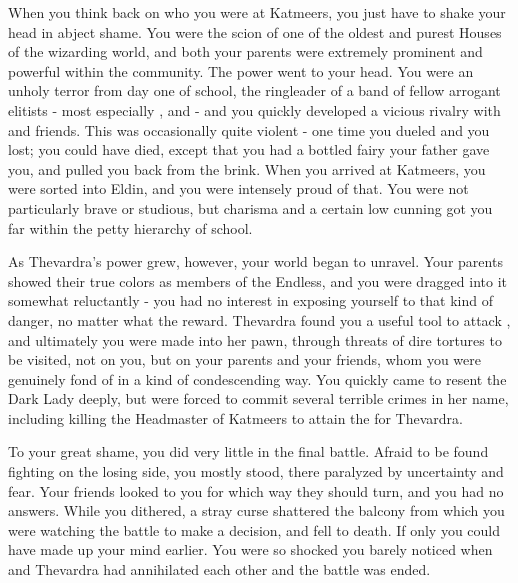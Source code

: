 \documentclass[char]{Katmeers}
\begin{document}
\name{\cMalfoy{}}


When you think back on who you were at Katmeers, you just have to shake your head in abject shame. You were the scion of one of the oldest and purest Houses of the wizarding world, and both your parents were extremely prominent and powerful within the community. The power went to your head. You were an unholy terror from day one of school, the ringleader of a band of fellow arrogant elitists - most especially \cGoyle{}, \cCrabbe{} and \cLucius{} - and you quickly developed a vicious rivalry with \cHarry{} and \cHarry{\their} friends. This was occasionally quite violent - one time you dueled \cHarry{} and you lost; you could have died, except that you had a bottled fairy your father gave you, and \cFairy{\they} pulled you back from the brink. When you arrived at Katmeers, you were sorted into Eldin, and you were intensely proud of that. You were not particularly brave or studious, but charisma and a certain low cunning got you far within the petty hierarchy of school.

As Thevardra's power grew, however, your world began to unravel. Your parents showed their true colors as members of the Endless, and you were dragged into it somewhat reluctantly - you had no interest in exposing yourself to that kind of danger, no matter what the reward. Thevardra found you a useful tool to attack \cHarry{}, and ultimately you were made into her pawn, through threats of dire tortures to be visited, not on you, but on your parents and your friends, whom you were genuinely fond of in a kind of condescending way. You quickly came to resent the Dark Lady deeply, but were forced to commit several terrible crimes in her name, including killing the Headmaster of Katmeers to attain the \iWisdom{} for Thevardra.

To your great shame, you did very little in the final battle. Afraid to be found fighting on the losing side, you mostly stood, there paralyzed by uncertainty and fear. Your friends looked to you for which way they should turn, and you had no answers. While you dithered, a stray curse shattered the balcony from which you were watching the battle to make a decision, and \cGhost{\formal} fell to \cGhost{\their} death. If only you could have made up your mind earlier. You were so shocked you barely noticed when \cHarry{} and Thevardra had annihilated each other and the battle was ended.
\end{document}
